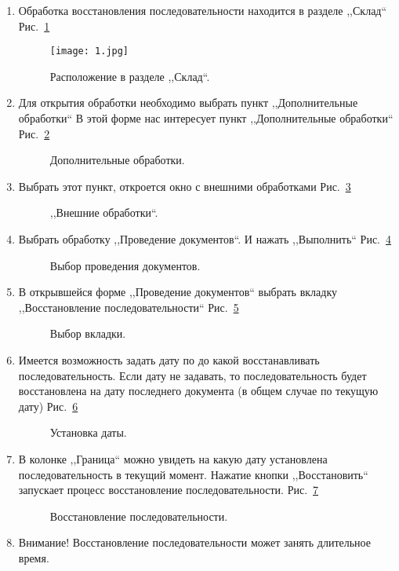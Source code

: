 \begin{enumerate}	
	\item Обработка восстановления последовательности находится в разделе ,,Склад`` Рис.~\ref{ris:1.jpg}
	\begin{figure}[H]
		\texttt{[image: 1.jpg]}
		\caption{Расположение в разделе ,,Склад``.}
		\label{ris:1.jpg}
	\end{figure}
	\item Для открытия обработки необходимо выбрать пункт ,,Дополнительные обработки``	
	В этой форме нас интересует пункт ,,Дополнительные обработки`` Рис.~\ref{ris:2.jpg}
	\begin{figure}[H]
		\caption{Дополнительные обработки.}
		\label{ris:2.jpg}
	\end{figure}
	\item Выбрать этот пункт, откроется окно с внешними обработками Рис.~\ref{ris:3.jpg}	
	\begin{figure}[H]
		\caption{,,Внешние обработки``.}
		\label{ris:3.jpg}
	\end{figure}
	\item Выбрать  обработку  ,,Проведение документов``.  И нажать ,,Выполнить`` Рис.~\ref{ris:4.jpg}	
	\begin{figure}[H]
		\caption{Выбор проведения документов.}
		\label{ris:4.jpg}
	\end{figure}
	\item В открывшейся форме ,,Проведение документов`` выбрать вкладку ,,Восстановление последовательности`` Рис.~\ref{ris:5.jpg} 
	\begin{figure}[H]
		\caption{Выбор вкладки.}
		\label{ris:5.jpg}
	\end{figure}
	\item Имеется возможность задать дату по до какой восстанавливать последовательность. Если дату не задавать, 
		  то последовательность будет восстановлена на дату последнего документа (в общем случае по текущую дату) Рис.~\ref{ris:5_1.jpg} 
	\begin{figure}[H]
		\caption{Установка даты.}
		\label{ris:5_1.jpg}
	\end{figure}
	\item В колонке ,,Граница`` можно увидеть на какую дату установлена последовательность в текущий момент. Нажатие кнопки ,,Восстановить`` запускает процесс восстановление последовательности. Рис.~\ref{ris:6.jpg} 
	\begin{figure}[H]
		\caption{Восстановление последовательности.}
		\label{ris:6.jpg}
	\end{figure}
	\item Внимание! Восстановление последовательности может занять длительное время.
	\end{enumerate}

